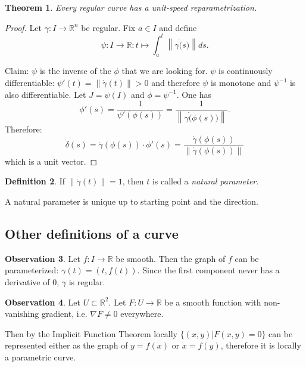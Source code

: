 \documentclass[a4paper,11pt,notitlepage,fullpage]{paper}
\theoremstyle{plain}
\newtheorem{thm}{Theorem}[section] %
\theoremstyle{definition}
\newtheorem{defn}[thm]{Definition} %
\newtheorem{obsv}[thm]{Observation}
\begin{document}
\begin{thm}
Every regular curve has a unit-speed reparametrization.
\end{thm}
\begin{proof} Let $\gamma: I \to \mathbb R^n$ be regular. Fix $a \in I$ and define
\begin{equation*}
\psi: I \to \mathbb R: t \mapsto \int_a^t \left\|\gamma\dot(s)\right\| ds.
\end{equation*}

Claim: $\psi$ is the inverse of the $\phi$ that we are looking for.
$\psi$ is continuously differentiable: $\psi'(t) = \left\|\dot\gamma(t)\right\| > 0$ and therefore $\psi$ is monotone and $\psi^{-1}$ is also differentiable.
Let $J = \psi(I)$ and $\phi = \psi^{-1}$. One has
\begin{equation*}
\phi'(s) = \frac{1}{\psi'(\phi(s))} = \frac{1}{\left\|\gamma\dot(\phi(s))\right\|}.
\end{equation*}
Therefore: 
\begin{equation*}
\dot\delta(s) = \dot\gamma(\phi(s)) \cdot \phi'(s) = \frac{\dot\gamma(\phi(s))}{\left\|\dot\gamma(\phi(s))\right\|}
\end{equation*}
which is a unit vector. \end{proof}


\begin{defn}
If $\left\|\dot\gamma(t)\right\| = 1$, then $t$ is called a \emph{natural parameter}.

A natural parameter is unique up to starting point and the direction.
\end{defn}


\subsection{Other definitions of a curve}


\begin{obsv}
Let $f: I \to \mathbb R$ be smooth. Then the graph of $f$ can be parameterized: $\gamma(t) = (t, f(t))$. Since the first component never has a derivative of $0$, $\gamma$ is regular.
\end{obsv}

\begin{obsv}
Let $U \subset \mathbb R^2$. Let $F: U \to \mathbb R$ be a smooth function with non-vanishing gradient, i.e. $\nabla F \neq 0$ everywhere.

Then by the Implicit Function Theorem locally $\{(x,y)|F(x,y) = 0\}$ can be represented either as the graph of $y = f(x)$ or $x = f(y)$, therefore it is locally a parametric curve.
\end{obsv}
\end{document}
